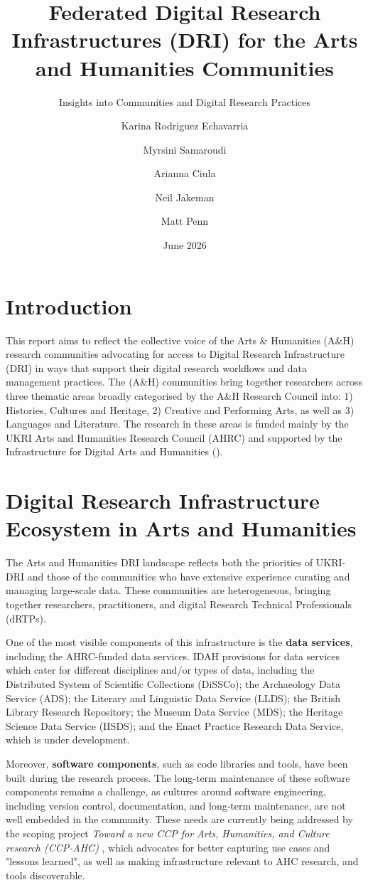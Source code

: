 \documentclass[11pt]{scrartcl}
\title{Federated Digital Research Infrastructures (DRI) for the Arts and Humanities Communities}
\subtitle{\LARGE{Insights into Communities and Digital Research Practices}}
\date{\normalsize{June 2026}}
\author[1]{Karina Rodriguez Echavarria}
\author[1]{Myrsini Samaroudi}
\author[2]{Arianna Ciula}
\author[2]{Neil Jakeman}
\author[2]{Matt Penn}
\affil[1]{University of Brighton}
\affil[2]{King's Digital Lab, King's College London}
\begin{document}
\sffamily
\maketitle
\section{Introduction} 
This report aims to reflect the collective voice of the Arts \& Humanities (A\&H) research communities advocating for access to Digital Research
 Infrastructure (DRI) in ways that support their digital research workflows and data management practices. 
 The (A\&H) communities bring together researchers across three
 thematic areas broadly categorised by the A\&H Research Council into: 1)
 Histories, Cultures and Heritage, 2) Creative and Performing Arts, as well as
 3) Languages and Literature. The research in these areas is
 funded mainly by the UKRI Arts and Humanities Research Council (AHRC) and
 supported by the Infrastructure for Digital Arts and Humanities ().   

\section{Digital Research Infrastructure Ecosystem in Arts and Humanities}
The Arts and Humanities DRI landscape reflects both the priorities of UKRI-DRI and those of the communities who have extensive experience curating and managing large-scale data. These communities are heterogeneous, bringing together researchers, practitioners, and digital Research Technical Professionals (dRTPs).

One of the most visible components of this infrastructure is the \textbf{data services}, including the AHRC-funded data services. IDAH provisions for data services which cater for different disciplines
and/or types of data, including the Distributed System of Scientific
Collections (DiSSCo); the Archaeology Data Service (ADS); the Literary and Linguistic Data Service (LLDS); the British Library Research Repository; the Museum Data Service (MDS); the Heritage Science Data Service (HSDS); and the Enact Practice Research Data Service, which is under development.

Moreover, \textbf{software components}, such as code libraries and tools, have been built during the research process.
The long-term maintenance of these software components remains a challenge, as cultures around software engineering, including version control, documentation, and long-term maintenance, are not well embedded in the community. These needs are   
currently being addressed by the scoping project \emph{Toward a new CCP for Arts, Humanities, and Culture research (CCP-AHC)} \cite{bell_2025_17099176}, which advocates for better capturing use cases and "lessons learned", as well as making infrastructure relevant to AHC research, and tools discoverable. 
\end{document}
